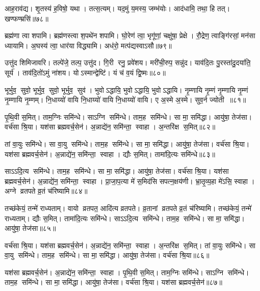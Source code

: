आह॒राव॑द्य। शृ॒तस्य॑ ह॒विषो॒ यथा। तत्स॒त्यम्। यद॒मुं य॒मस्य॒ जम्भ॑योः। आद॑धामि॒ तथा॒ हि तत्। खण्फण्म्रसि॑॥७८॥
\anuvakamend


ब्रह्म॑णा त्वा शपामि। ब्रह्म॑णस्त्वा श॒पथे॑न शपामि। घो॒रेण॑ त्वा॒ भृगू॑णां॒ चक्षु॑षा॒ प्रेक्षे। रौ॒द्रेण॒ त्वाङ्गि॑रसां॒ मन॑सा ध्यायामि। अ॒घस्य॑ त्वा॒ धार॑या विद्ध्यामि। अध॑रो॒ मत्प॑द्यस्वाऽसौ॥७९॥%
\anuvakamend


उत्तु॑द शिमिजावरि। तल्पे॑जे॒ तल्प॒ उत्तु॑द। गि॒री रनु॒ प्रवे॑शय। मरी॑ची॒रुप॒ सन्नु॑द। याव॑दि॒तः पु॒रस्ता॑दु॒दया॑ति॒ सूर्य॑। ताव॑दि॒तो॑ऽमुं ना॑शय। योऽस्मान्द्वेष्टि॑। यं च॑ व॒यं द्वि॒ष्मः॥८०॥
\anuvakamend


भूर्भुव॒ सुवो॒ भूर्भुव॒ सुवो॒ भूर्भुव॒ सुव॑। भुवोऽद्धायि॒ भुवोऽद्धायि॒ भुवोऽद्धायि। नृ॒म्णायि नृ॒म्णं नृ॒म्णायि नृ॒म्णं नृ॒म्णायि नृ॒म्णम्। नि॒धाय्यो॑ वायि नि॒धाय्यो॑ वायि नि॒धाय्यो॑ वायि। ए अ॒स्मे अ॒स्मे। सुव॒र्न ज्योती॥८१॥
\anuvakamend


पृ॒थि॒वी स॒मित्। ताम॒ग्निः समि॑न्धे। साऽग्नि समि॑न्धे। ताम॒ह समि॑न्धे। सा मा॒ समि॑द्धा। आयु॑षा॒ तेज॑सा। वर्च॑सा श्रि॒या। यश॑सा ब्रह्मवर्च॒सेन॑। अ॒न्नाद्ये॑न॒ समि॑न्ता॒ स्वाहा। अ॒न्तरि॑क्ष स॒मित्॥८२॥

तां वा॒युः समि॑न्धे। सा वा॒यु समि॑न्धे। ताम॒ह समि॑न्धे। सा मा॒ समि॑द्धा। आयु॑षा॒ तेज॑सा। वर्च॑सा श्रि॒या। यश॑सा ब्रह्मवर्च॒सेन॑। अ॒न्नाद्ये॑न॒ समि॑न्ता॒ स्वाहा। द्यौः स॒मित्। तामा॑दि॒त्यः समि॑न्धे॥८३॥

साऽऽदि॒त्य समि॑न्धे। ताम॒ह समि॑न्धे। सा मा॒ समि॑द्धा। आयु॑षा॒ तेज॑सा। वर्च॑सा श्रि॒या। यश॑सा ब्रह्मवर्च॒सेन॑। अ॒न्नाद्ये॑न॒ समि॑न्ता॒ स्वाहा। प्रा॒जा॒प॒त्या मे॑ स॒मिद॑सि सपत्न॒क्षय॑णी। भ्रा॒तृ॒व्य॒हा मे॑ऽसि॒ स्वाहा। अग्ने व्रतपते व्र॒तं च॑रिष्यामि॥८४॥

तच्छ॑केयं॒ तन्मे॑ राध्यताम्। वायो व्रतपत॒ आदि॑त्य व्रतपते। व्र॒तानां व्रतपते व्र॒तं च॑रिष्यामि। तच्छ॑केयं॒ तन्मे॑ राध्यताम्। द्यौः स॒मित्। तामा॑दि॒त्यः समि॑न्धे। साऽऽदि॒त्य समि॑न्धे। ताम॒ह समि॑न्धे। सा मा॒ समि॑द्धा। आयु॑षा॒ तेज॑सा॥८५॥

वर्च॑सा श्रि॒या। यश॑सा ब्रह्मवर्च॒सेन॑। अ॒न्नाद्ये॑न॒ समि॑न्ता॒ स्वाहा। अ॒न्तरि॑क्ष स॒मित्। तां वा॒युः समि॑न्धे। सा वा॒यु समि॑न्धे। ताम॒ह समि॑न्धे। सा मा॒ समि॑द्धा। आयु॑षा॒ तेज॑सा। वर्च॑सा श्रि॒या॥८६॥

यश॑सा ब्रह्मवर्च॒सेन॑। अ॒न्नाद्ये॑न॒ समि॑न्ता॒ स्वाहा। पृ॒थि॒वी स॒मित्। ताम॒ग्निः समि॑न्धे। साऽग्नि समि॑न्धे। ताम॒ह समि॑न्धे। सा मा॒ समि॑द्धा। आयु॑षा॒ तेज॑सा। वर्च॑सा श्रि॒या। यश॑सा ब्रह्मवर्च॒सेन॑॥८७॥

